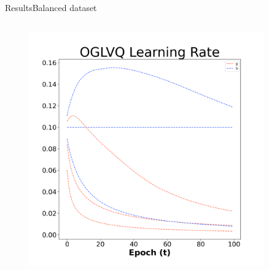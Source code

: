 \documentclass[
	aspectratio=169,	%
	onlytextwidth,		%
	t,					%
	]{beamer}
\begin{document}
\begin{frame}[fragile]{Results}{Balanced dataset}
\begin{columns}
			\begin{column}[T]{0.33\textwidth}
				\begin{figure}
					\includegraphics[width=0.9\textwidth]{myfigs/OGLVQ_b.png}
				\end{figure}
			\end{column}
		
			
		\end{columns}
		
		\centering		\color{red}{Be careful with y-axis, since they do not share common size}
	
	\end{frame}
	
\end{document}
